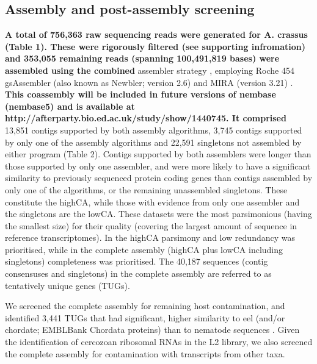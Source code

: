 \documentclass[10pt]{bmc_article}
\newenvironment{bmcformat}{\begin{raggedright}\baselineskip20pt\sloppy\setboolean{publ}{false}}{\end{raggedright}\baselineskip20pt\sloppy}
\begin{document}
\begin{bmcformat}
\subsection*{Assembly and post-assembly screening}

\textbf{A total of 756,363 raw sequencing reads were generated for
  A. crassus (Table 1). These were rigorously filtered (see supporting
  infromation) and 353,055 remaining reads (spanning 100,491,819
  bases) were assembled using the combined} assembler strategy
\cite{pmid20950480}, employing Roche 454 gsAssembler (also known as
Newbler; version 2.6) and MIRA (version 3.21)
\cite{miraEST}. \textbf{This coassembly will be included in future
  versions of nembase (nembase5) and is available at
  http://afterparty.bio.ed.ac.uk/study/show/1440745. It comprised}
13,851 contigs supported by both assembly algorithms, 3,745 contigs
supported by only one of the assembly algorithms and 22,591 singletons
not assembled by either program (Table 2). Contigs supported by both
assemblers were longer than those supported by only one assembler, and
were more likely to have a significant similarity to previously
sequenced protein coding genes than contigs assembled by only one of
the algorithms, or the remaining unassembled singletons. These
constitute the highCA, while those with evidence from only one
assembler and the singletons are the lowCA. These datasets were the
most parsimonious (having the smallest size) for their quality
(covering the largest amount of sequence in reference
transcriptomes). In the highCA parsimony and low redundancy was
prioritised, while in the complete assembly (highCA plus lowCA
including singletons) completeness was prioritised. The 40,187
sequences (contig consensuses and singletons) in the complete assembly
are referred to as tentatively unique genes (TUGs).



We screened the complete assembly for remaining host contamination,
and identified 3,441 TUGs that had significant, higher
similarity to eel (and/or chordate; EMBLBank Chordata proteins) than
to nematode sequences \cite{pmid21550347}. Given the identification of
cercozoan ribosomal RNAs in the L2 library, we also screened the
complete assembly for contamination with transcripts from other taxa.


\end{bmcformat}
\end{document}
